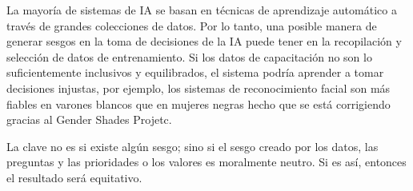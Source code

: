 \documentclass[10pt]{article}
\begin{document}
La mayoría de sistemas de IA se basan en técnicas de aprendizaje automático a través de grandes colecciones de datos. Por lo tanto, una posible manera de generar sesgos en la toma de decisiones de la IA puede tener en la recopilación y selección de datos de entrenamiento. Si los datos de capacitación no son lo suficientemente inclusivos y equilibrados, el sistema podría aprender a tomar decisiones injustas, por ejemplo, los sistemas de reconocimiento facial son más ﬁables en varones blancos que en mujeres negras hecho que se está corrigiendo gracias al Gender Shades Projetc.


La clave no es si existe algún sesgo; sino si el sesgo creado por los datos, las preguntas y las prioridades o los valores es moralmente neutro. Si es así, entonces el resultado será equitativo. \cite{avila-tomas_inteligencia_2021}
        
\end{document}
